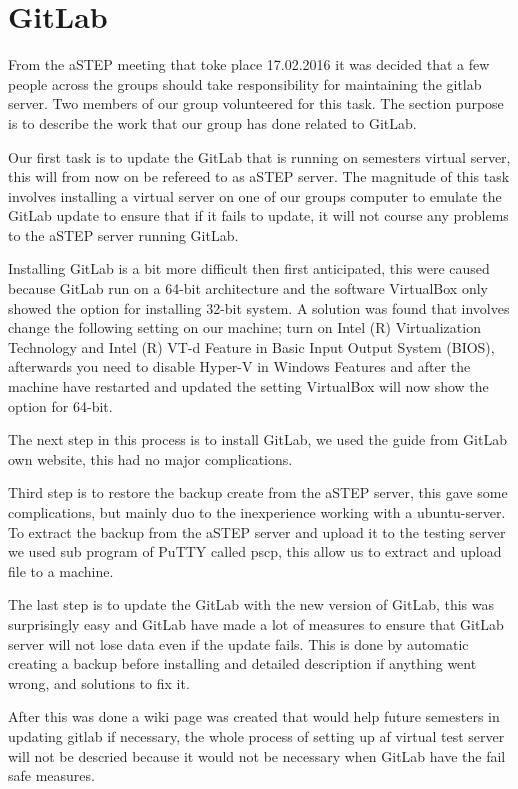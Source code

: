 \section{GitLab}
From the aSTEP meeting that toke place 17.02.2016 it was decided that a few people across the groups should take responsibility for maintaining the gitlab server. Two members of our group volunteered for this task. The section purpose is to describe the work that our group has done related to GitLab.

Our first task is to update the GitLab that is running on semesters virtual server, this will from now on be refereed to as aSTEP server. The magnitude of this task involves installing a virtual server on one of our groups computer to emulate the GitLab update to ensure that if it fails to update, it will not course any problems to the aSTEP server running GitLab.

Installing GitLab is a bit more difficult then first anticipated, this were caused because GitLab run on a 64-bit architecture and the software VirtualBox only showed the option for installing 32-bit system. A solution was found that involves change the following setting on our machine; turn on Intel (R) Virtualization Technology and Intel (R) VT-d Feature in Basic Input Output System (BIOS), afterwards you need to disable Hyper-V in Windows Features and after the machine have restarted and updated the setting VirtualBox will now show the option for 64-bit.

The next step in this process is to install GitLab, we used the guide from GitLab own website\cite{gitlab_guide}, this had no major complications.

Third step is to restore the backup create from the aSTEP server, this gave some complications, but mainly duo to the inexperience working with a ubuntu-server. To extract the backup from the aSTEP server and upload it to the testing server we used sub program of PuTTY called pscp, this allow us to extract and upload file to a machine.

The last step is to update the GitLab with the new version of GitLab, this was surprisingly easy and GitLab have made a lot of measures to ensure that GitLab server will not lose data even if the update fails. This is done by automatic creating a backup before installing and detailed description if anything went wrong, and solutions to fix it.

After this was done a wiki page was created that would help future semesters in updating gitlab if necessary, the whole process of setting up af virtual test server will not be descried because it would not be necessary when GitLab have the fail safe measures.


